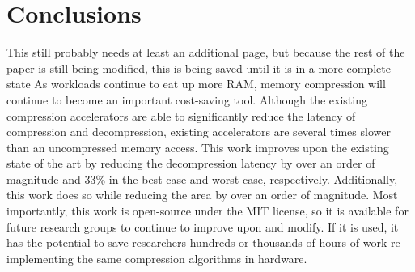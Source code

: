\documentclass[doublespace,nopageskip]{VTthesis}
\begin{document}
\chapter{Conclusions} \label{ch:conclusions}
{\color{red} This still probably needs at least an additional page, but because the rest of the paper is still being modified, this is being saved until it is in a more complete state}
As workloads continue to eat up more RAM, memory compression will continue to become an important cost-saving tool. Although the existing compression accelerators are able to significantly reduce the latency of compression and decompression, existing accelerators are several times slower than an uncompressed memory access. This work improves upon the existing state of the art by reducing the decompression latency by over an order of magnitude and 33\% in the best case and worst case, respectively. Additionally, this work does so while reducing the area by over an order of magnitude. Most importantly, this work is open-source under the MIT license, so it is available for future research groups to continue to improve upon and modify. If it is used, it has the potential to save researchers hundreds or thousands of hours of work re-implementing the same compression algorithms in hardware.


   


\end{document}
